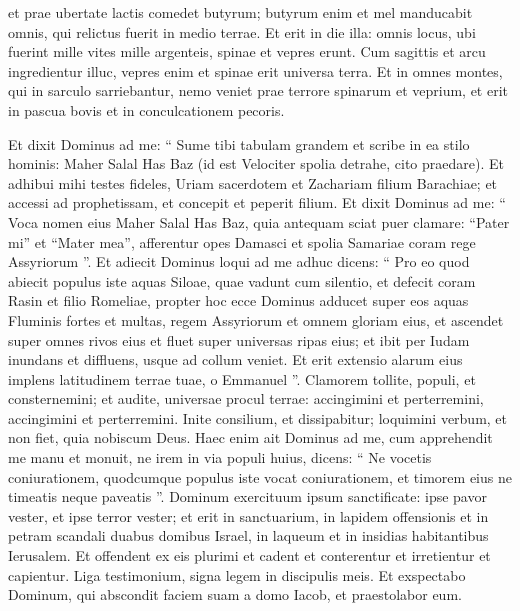 \begin{biblechapter}
\begin{biblechapter}
\begin{biblechapter}
\begin{biblechapter}
\begin{biblechapter}
\begin{biblechapter}
\begin{biblechapter}
 \verse et prae ubertate lactis
 comedet butyrum;
 butyrum enim et mel manducabit omnis,
 qui relictus fuerit in medio terrae.
 \verse Et erit in die illa:
 omnis locus, ubi fuerint mille vites mille argenteis,
 spinae et vepres erunt.
 \verse Cum sagittis et arcu ingredientur illuc,
 vepres enim et spinae erit universa terra.
 \verse Et in omnes montes, qui in sarculo sarriebantur,
 nemo veniet prae terrore spinarum et veprium,
 et erit in pascua bovis et in conculcationem pecoris.
 
\begin{biblechapter}
\verse Et dixit Dominus ad me: “ Sume tibi tabulam grandem et scribe in ea stilo hominis: Maher Salal Has Baz (id est Velociter spolia detrahe, cito praedare). 
 \verse Et adhibui mihi testes fideles, Uriam sacerdotem et Zachariam filium Barachiae; 
\verse et accessi ad prophetissam, et concepit et peperit filium. Et dixit Dominus ad me: “ Voca nomen eius Maher Salal Has Baz, 
\verse quia antequam sciat puer clamare: “Pater mi” et “Mater mea”, afferentur opes Damasci et spolia Samariae coram rege Assyriorum ”. 
\verse Et adiecit Dominus loqui ad me adhuc dicens:
 \verse “ Pro eo quod abiecit populus iste aquas Siloae,
 quae vadunt cum silentio,
 et defecit coram Rasin et filio Romeliae,
 \verse propter hoc ecce Dominus adducet super eos
 aquas Fluminis fortes et multas,
 regem Assyriorum et omnem gloriam eius,
 et ascendet super omnes rivos eius
 et fluet super universas ripas eius;
 \verse et ibit per Iudam inundans et diffluens,
 usque ad collum veniet.
 Et erit extensio alarum eius
 implens latitudinem terrae tuae, o Emmanuel ”.
 \verse Clamorem tollite, populi, et consternemini;
 et audite, universae procul terrae:
 accingimini et perterremini,
 accingimini et perterremini.
 \verse Inite consilium, et dissipabitur;
 loquimini verbum, et non fiet,
 quia nobiscum Deus.
 \verse Haec enim ait Dominus ad me, cum apprehendit me manu et monuit, ne irem in via populi huius, dicens:
 \verse “ Ne vocetis coniurationem,
 quodcumque populus iste vocat coniurationem,
 et timorem eius ne timeatis neque paveatis ”.
 \verse Dominum exercituum ipsum sanctificate:
 ipse pavor vester, et ipse terror vester;
 \verse et erit in sanctuarium,
 in lapidem offensionis et in petram scandali
 duabus domibus Israel,
 in laqueum et in insidias habitantibus Ierusalem.
 \verse Et offendent ex eis plurimi
 et cadent et conterentur
 et irretientur et capientur.
 \verse Liga testimonium, signa legem in discipulis meis. 
\verse Et exspectabo Dominum, qui abscondit faciem suam a domo Iacob, et praestolabor eum. 

\end{biblechapter}
\end{biblechapter}
\end{biblechapter}
\end{biblechapter}
\end{biblechapter}
\end{biblechapter}
\end{biblechapter}
\end{biblechapter}
